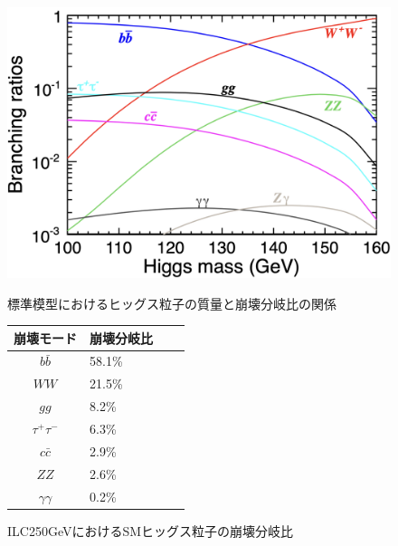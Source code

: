 \begin{figure}[H]
 \begin{minipage}[h]{.45\linewidth}
	\begin{center}
 \includegraphics[keepaspectratio, scale=0.2]
 	{Figure/Introduction/higgs_decay.png}
 		\caption{標準模型におけるヒッグス粒子の質量と崩壊分岐比の関係}
 		\label{higgs_decay}
	\end{center}
 \end{minipage}
 \hfill
\begin{minipage}[h]{.45\linewidth}
\def\@captype{table}
 \centering
  \begin{tabular}{clll}
   \hline
   崩壊モード & 崩壊分岐比\\
   \hline \hline
   $b\bar{b}$ & 58.1\%\\
   $WW$ & 21.5\%\\
   $gg$ & 8.2\%\\
   ${\tau}^+ {\tau}^-$ & 6.3\%\\
   $c \bar{c}$ & 2.9\%\\
   $ZZ$ & 2.6\%\\
   $\gamma \gamma$ & 0.2\%\\
   \hline
  \end{tabular}
   \caption{ILC250GeVにおけるSMヒッグス粒子の崩壊分岐比}
   \label{HiggsDecayonILC}
 \end{minipage}
 \end{figure}
